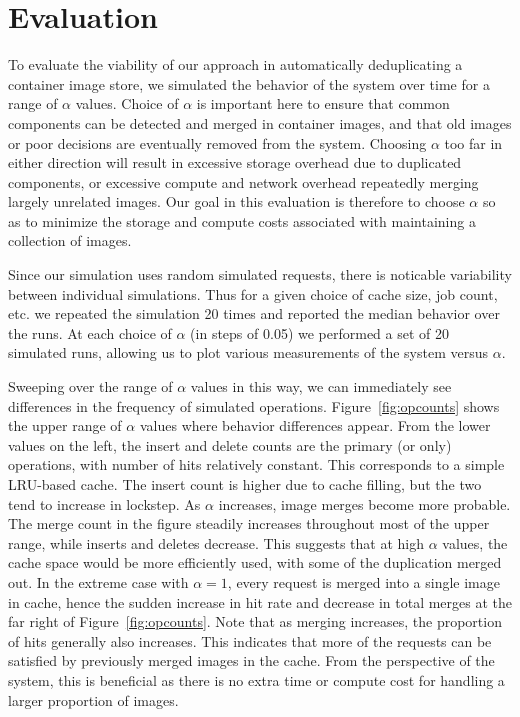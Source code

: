\documentclass[sigconf]{acmart}
\begin{document}
\section{Evaluation}
\label{sec:eval}

To evaluate the viability of our approach in automatically deduplicating a container image store,
we simulated the behavior of the system over time for a range of $\alpha$ values.
Choice of $\alpha$ is important here to ensure that common components can be detected and merged in container images,
and that old images or poor decisions are eventually removed from the system.
Choosing $\alpha$ too far in either direction will result in excessive storage overhead due to duplicated components,
or excessive compute and network overhead repeatedly merging largely unrelated images.
Our goal in this evaluation is therefore to choose $\alpha$ so as to minimize the storage and compute costs associated with maintaining a collection of images.


    
    Since our simulation uses random simulated requests,
there is noticable variability between individual simulations.
Thus for a given choice of cache size, job count, etc.
we repeated the simulation 20 times and reported the median behavior over the runs.
At each choice of $\alpha$ (in steps of 0.05)
we performed a set of 20 simulated runs,
allowing us to plot various measurements of the system versus $\alpha$.

Sweeping over the range of $\alpha$ values in this way,
we can immediately see differences in the frequency of simulated operations.
Figure~\ref{fig:opcounts} shows the upper range of $\alpha$ values where behavior differences appear.
From the lower values on the left,
the insert and delete counts are the primary (or only) operations,
with number of hits relatively constant.
This corresponds to a simple LRU-based cache.
The insert count is higher due to cache filling,
but the two tend to increase in lockstep.
As $\alpha$ increases,
image merges become more probable.
The merge count in the figure steadily increases throughout most of the upper range,
while inserts and deletes decrease.
This suggests that at high $\alpha$ values,
the cache space would be more efficiently used,
with some of the duplication merged out.
In the extreme case with $\alpha=1$,
every request is merged into a single image in cache,
hence the sudden increase in hit rate and decrease in total merges at the far right of Figure~\ref{fig:opcounts}.
Note that as merging increases,
the proportion of hits generally also increases.
This indicates that more of the requests can be satisfied by previously merged images in the cache.
From the perspective of the system,
this is beneficial as there is no extra time or compute cost for handling a larger proportion of images.
\end{document}
